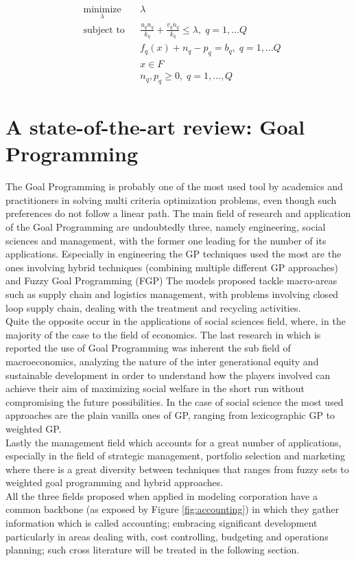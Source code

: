 \begin{doublespace}
\begin{equation*}
\begin{aligned}
& \underset{\lambda}{\text{minimize}}
& & \lambda \\
& \text{subject to}
& & \frac{u_q n_q}{k_q}+\frac{v_q n_q}{k_q}\leq\lambda, \; q=1,...Q \\
& & & f_q(x)+n_q-p_q=b_q, \; q=1,...Q \\
& & & x\in F \\
& & & n_q,p_q\geq 0, \; q=1,...,Q 
\end{aligned}
\end{equation*}

\pagebreak 

\section{A state-of-the-art review: Goal Programming}
The Goal Programming is probably one of the most used tool by academics and practitioners in solving multi criteria optimization problems, even though such preferences do not follow a linear path\cite{Romero2014}\cite{Schniederjans1995}. The main field of research and application of the Goal Programming are undoubtedly three, namely engineering, social sciences and management\cite{Colapinto2017a}, with the former one leading for the number of its applications.
Especially in engineering the GP techniques used the most are the ones involving hybrid techniques (combining multiple different GP approaches) and Fuzzy Goal Programming (FGP) The models proposed tackle macro-areas such as supply chain and logistics management, with problems involving closed loop supply chain, dealing with the treatment and recycling activities\cite{Zarandi2011}. 
\\
Quite the opposite occur in the applications of social sciences field, where, in the majority of the case to the field of economics. The last research in which is reported the use of Goal Programming was inherent the sub field of macroeconomics, analyzing the nature of the inter generational equity and sustainable development in order to understand how the players involved can achieve their aim of maximizing social welfare in the short run without compromising the future possibilities. In the case of social science the most used approaches are the plain vanilla ones of GP, ranging from lexicographic GP to weighted GP.
\\
Lastly the management field which accounts for a great number of applications, especially in the field of strategic management, portfolio selection and marketing where there is a great diversity between techniques that ranges from fuzzy sets\cite{Trenado2014} to weighted goal programming and hybrid approaches.
\\
All the three fields proposed when applied in modeling corporation have a common backbone (as exposed by Figure \ref{fig:accounting})  in which they gather information which is called accounting; embracing significant development particularly in areas dealing with, cost controlling, budgeting and operations planning; such cross literature will be treated in the following section.


\end{doublespace}
